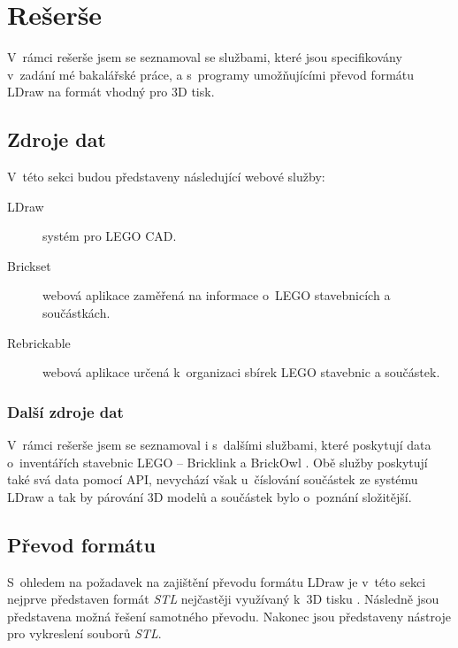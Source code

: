 \chapter{Rešerše}
V~rámci rešerše jsem se seznamoval se službami, které jsou specifikovány v~zadání mé bakalářské práce, a s~programy umožňujícími převod formátu LDraw na formát vhodný pro 3D tisk.


\section{Zdroje dat}  

V~této sekci budou představeny následující webové služby:
\begin{description}
  \item[LDraw] systém pro LEGO \gls{CAD}.
  \item[Brickset] webová aplikace zaměřená na informace o~LEGO stavebnicích a součástkách.
  \item[Rebrickable] webová aplikace určená k~organizaci sbírek LEGO stavebnic a součástek.
\end{description}




\subsection{Další zdroje dat}
V~rámci rešerše jsem se seznamoval i s~dalšími službami, které poskytují data o~inventářích stavebnic LEGO – Bricklink \autocite{bricklink} a BrickOwl \autocite{brickowl}. Obě služby poskytují také svá data pomocí \gls{API}, nevychází však u~číslování součástek ze systému LDraw a tak by párování 3D modelů a součástek bylo o~poznání složitější. 

\section{Převod formátu}
S~ohledem na požadavek na zajištění převodu formátu LDraw je v~této sekci nejprve představen formát \textit{\gls{STL}} nejčastěji využívaný k~3D tisku \autocite{3DAddFab}. Následně jsou představena možná řešení samotného převodu. Nakonec jsou představeny nástroje pro vykreslení souborů \textit{STL}.






